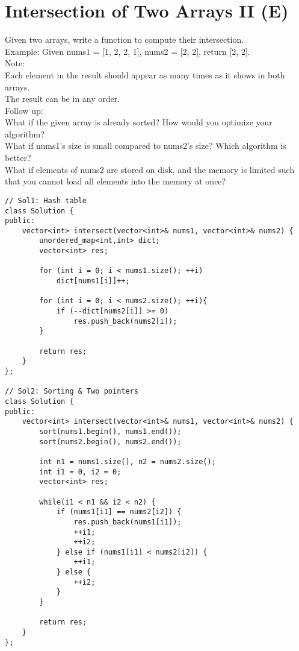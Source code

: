 \section{Intersection of Two Arrays II (E)}
Given two arrays, write a function to compute their intersection.\\

Example:
Given nums1 = [1, 2, 2, 1], nums2 = [2, 2], return [2, 2].\\

Note:\\
    Each element in the result should appear as many times as it shows in both arrays.\\
    The result can be in any order.\\

Follow up:\\
    What if the given array is already sorted? How would you optimize your algorithm?\\
    What if nums1's size is small compared to nums2's size? Which algorithm is better?\\
    What if elements of nums2 are stored on disk, and the memory is limited such that you cannot load all elements into the memory at once?\\

\begin{lstlisting}
// Sol1: Hash table
class Solution {
public:
    vector<int> intersect(vector<int>& nums1, vector<int>& nums2) {
        unordered_map<int,int> dict;
        vector<int> res;
        
        for (int i = 0; i < nums1.size(); ++i)
            dict[nums1[i]]++;
            
        for (int i = 0; i < nums2.size(); ++i){
            if (--dict[nums2[i]] >= 0)
                res.push_back(nums2[i]);
        }
        
        return res;
    }
};

// Sol2: Sorting & Two pointers
class Solution {
public:
    vector<int> intersect(vector<int>& nums1, vector<int>& nums2) {
        sort(nums1.begin(), nums1.end());
        sort(nums2.begin(), nums2.end());
        
        int n1 = nums1.size(), n2 = nums2.size();
        int i1 = 0, i2 = 0;
        vector<int> res;
        
        while(i1 < n1 && i2 < n2) {
            if (nums1[i1] == nums2[i2]) {
                res.push_back(nums1[i1]);
                ++i1;
                ++i2;
            } else if (nums1[i1] < nums2[i2]) {
                ++i1;
            } else {
                ++i2;
            }
        }
        
        return res;
    }
};
\end{lstlisting}  


